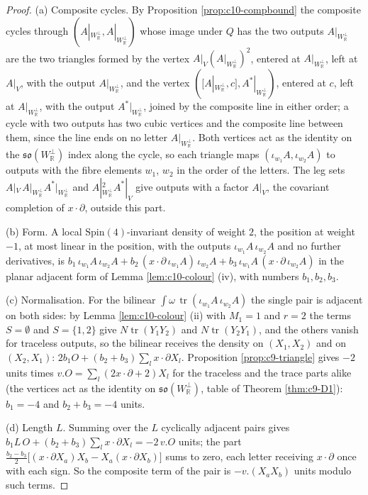 \begin{proof}
(a) Composite cycles. By Proposition \ref{prop:c10-compbound} the composite cycles through $(A|_{W_{\mathbb R}^\perp},A|_{W_{\mathbb R}^\perp})$ whose image under $Q$ has the two outputs $A|_{W_{\mathbb R}^\perp}$ are the two triangles formed by the vertex $A|_V(A|_{W_{\mathbb R}^\perp})^2$, entered at $A|_{W_{\mathbb R}^\perp}$, left at $A|_V$, with the output $A|_{W_{\mathbb R}^\perp}$, and the vertex $([A|_{W_{\mathbb R}^\perp},c],A^*|_{W_{\mathbb R}^\perp})$, entered at $c$, left at $A|_{W_{\mathbb R}^\perp}$, with the output $A^*|_{W_{\mathbb R}^\perp}$, joined by the composite line in either order; a cycle with two outputs has two cubic vertices and the composite line between them, since the line ends on no letter $A|_{W_{\mathbb R}^\perp}$. Both vertices act as the identity on the $\mathfrak{so}(W_{\mathbb R}^\perp)$ index along the cycle, so each triangle maps $(\iota_{w_1}A,\iota_{w_2}A)$ to outputs with the fibre elements $w_1$, $w_2$ in the order of the letters. The leg sets $A|_V\,A|_{W_{\mathbb R}^\perp}A^*|_{W_{\mathbb R}^\perp}$ and $A|_{W_{\mathbb R}^\perp}^2A^*|_V$ give outputs with a factor $A|_V$, the covariant completion of $x\cdot\partial$, outside this part.

(b) Form. A local $\mathrm{Spin}(4)$-invariant density of weight $2$, the position at weight $-1$, at most linear in the position, with the outputs $\iota_{w_1}A\,\iota_{w_2}A$ and no further derivatives, is $b_1\,\iota_{w_1}A\,\iota_{w_2}A+b_2\,(x\cdot\partial\,\iota_{w_1}A)\,\iota_{w_2}A+b_3\,\iota_{w_1}A\,(x\cdot\partial\,\iota_{w_2}A)$ in the planar adjacent form of Lemma \ref{lem:c10-colour} (iv), with numbers $b_1,b_2,b_3$.

(c) Normalisation. For the bilinear $\int\omega\,\operatorname{tr}(\iota_{w_1}A\,\iota_{w_2}A)$ the single pair is adjacent on both sides: by Lemma \ref{lem:c10-colour} (ii) with $M_1=1$ and $r=2$ the terms $S=\emptyset$ and $S=\{1,2\}$ give $N\operatorname{tr}(Y_1Y_2)$ and $N\operatorname{tr}(Y_2Y_1)$, and the others vanish for traceless outputs, so the bilinear receives the density on $(X_1,X_2)$ and on $(X_2,X_1)$: $2b_1O+(b_2+b_3)\sum_lx\cdot\partial X_l$. Proposition \ref{prop:c9-triangle} gives $-2$ units times $v.O=\sum_l(2x\cdot\partial+2)X_l$ for the traceless and the trace parts alike (the vertices act as the identity on $\mathfrak{so}(W_{\mathbb R}^\perp)$, table of Theorem \ref{thm:c9-D1}): $b_1=-4$ and $b_2+b_3=-4$ units.

(d) Length $L$. Summing over the $L$ cyclically adjacent pairs gives $b_1L\,O+(b_2+b_3)\sum_lx\cdot\partial X_l=-2\,v.O$ units; the part $\tfrac{b_2-b_3}2\big[(x\cdot\partial X_a)X_b-X_a(x\cdot\partial X_b)\big]$ sums to zero, each letter receiving $x\cdot\partial$ once with each sign. So the composite term of the pair is $-v.(X_aX_b)$ units modulo such terms.


\end{proof}
